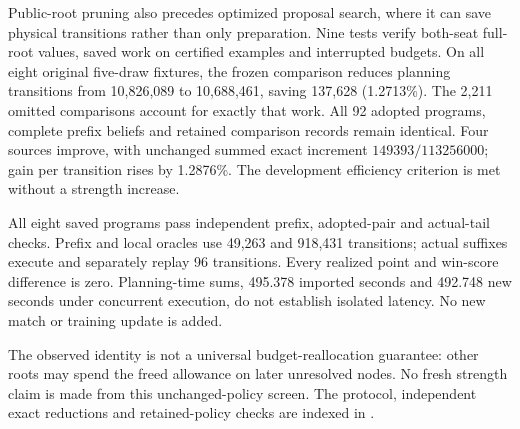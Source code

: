 Public-root pruning also precedes optimized proposal search, where it can
save physical transitions rather than only preparation. Nine tests verify
both-seat full-root values, saved work on certified examples and interrupted
budgets. On all eight original five-draw fixtures, the frozen comparison
reduces planning transitions from 10,826,089 to 10,688,461, saving 137,628
(1.2713\%). The 2,211 omitted comparisons account for exactly that work.
All 92 adopted programs, complete prefix beliefs and retained comparison
records remain identical. Four sources improve, with unchanged summed exact
increment $149393/113256000$; gain per transition rises by 1.2876\%.
The development efficiency criterion is met without a strength increase.

All eight saved programs pass independent prefix, adopted-pair and actual-tail
checks. Prefix and local oracles use 49,263 and 918,431 transitions; actual
suffixes execute and separately replay 96 transitions. Every realized point
and win-score difference is zero. Planning-time sums, 495.378 imported seconds
and 492.748 new seconds under concurrent execution, do not establish isolated
latency. No new match or training update is added.

The observed identity is not a universal budget-reallocation guarantee: other
roots may spend the freed allowance on later unresolved nodes. No fresh
strength claim is made from this unchanged-policy screen. The protocol,
independent exact reductions and retained-policy checks are indexed in
.

